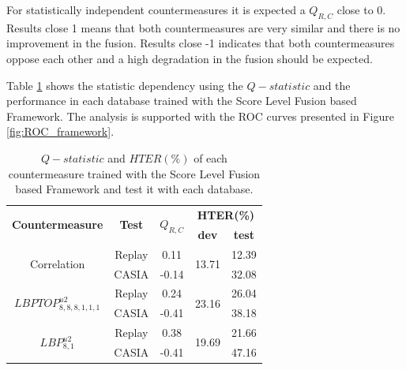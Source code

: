 For statistically independent countermeasures it is expected a $Q_{R,C}$ close to 0. Results close 1 means that both countermeasures are very similar and there is no improvement in the fusion. Results close -1 indicates that both countermeasures oppose each other and a high degradation in the fusion should be expected. 

Table \ref{tb:FrameworkTest} shows the statistic dependency using the $Q-statistic$ and the performance in each database trained with the Score Level Fusion based Framework. The analysis is supported with the ROC curves presented in Figure \ref{fig:ROC_framework}.

\begin{table}[ht]
\caption{$Q-statistic$ and $HTER(\%)$ of each countermeasure trained with the Score Level Fusion based Framework and test it with each database.}
\begin{center}
  \begin{tabular}{ | c | c | c | c  c |}
    \hline

   \multirow{2}{*}{\textbf{Countermeasure}} &  \multirow{2}{*}{\textbf{Test}} & \multirow{2}{*}{\textbf{$Q_{R,C}$}} & \multicolumn{2}{c|}{\textbf{HTER(\%)}}  \\ 
     &  &  & \textbf{dev} & \textbf{test}  \\ \hline
    
    \multirow{2}{*}{Correlation} & Replay & 0.11 &  \multirow{2}{*}{13.71} & 12.39\\
               & CASIA & -0.14 &  & 32.08 \\ \hline \hline

    \multirow{2}{*}{$LBPTOP_{8,8,8,1,1,1}^{u2}$}  & Replay  & 0.24 &\multirow{2}{*}{23.16} & 26.04 \\
               &  CASIA  & -0.41 & & 38.18 \\ \hline \hline

    \multirow{2}{*}{$LBP_{8,1}^{u2}$}  & Replay  & 0.38 & \multirow{2}{*}{19.69} & 21.66  \\
                & CASIA & -0.41 &  & 47.16 \\
    \hline
  \end{tabular}
\end{center}
\label{tb:FrameworkTest}
\end{table}



